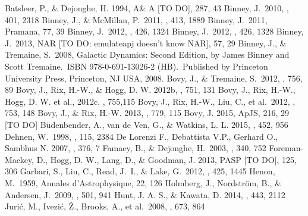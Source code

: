 \documentclass[iop,revtex4]{emulateapj}
\begin{document}
%
\begin{thebibliography}{}
 Batsleer, P., \& Dejonghe, H. 1994, A\& A [TO DO], 287, 43
 Binney, J.\ 2010, \mnras, 401, 2318
 Binney, J., \& McMillan, P.\ 2011, \mnras, 413, 1889
 Binney, J.\ 2011, Pramana, 77, 39
 Binney, J.\ 2012, \mnras, 426, 1324
 Binney, J.\ 2012, \mnras, 426, 1328
 Binney, J.\ 2013, NAR [TO DO: emulateapj doesn't know NAR], 57, 29 
 Binney, J., \& Tremaine, S.\ 2008, Galactic Dynamics: Second Edition, by James Binney and Scott Tremaine.~ISBN 978-0-691-13026-2 (HB).~Published by Princeton University Press, Princeton, NJ USA, 2008.
 Bovy, J., \& Tremaine, S.\ 2012, \apj, 756, 89
 Bovy, J., Rix, H.-W., \& Hogg, D. W. 2012b, \apj, 751, 131
 Bovy, J., Rix, H.-W., Hogg, D. W. et al., 2012c, \apj, 755,115
 Bovy, J., Rix, H.-W., Liu, C., et al.\ 2012, \apj, 753, 148
  Bovy, J., \& Rix, H.-W. 2013, \apj, 779, 115
 Bovy, J. 2015, ApJS, 216, 29 [TO DO]
 B\"{u}denbender, A., van de Ven, G., \& Watkins, L. L. 2015, \mnras, 452, 956
 Dehnen, W.\ 1998, \aj, 115, 
2384 
 De Lorenzi F., Debattista V.P., Gerhard O., Sambhus N. 2007, \mnras, 376, 7
 Famaey, B., \& Dejonghe, H.\ 2003, \mnras, 340, 752 
 Foreman-Mackey, D., Hogg, D. W., Lang, D., \& Goodman, J. 2013, PASP [TO DO], 125, 306
 Garbari, S., Liu, C., Read, J.~I., \& Lake, G.\ 2012, \mnras, 425, 1445 
 Henon, M.\ 1959, Annales d'Astrophysique, 22, 126 
 Holmberg, J., Nordstr{\"o}m, B., \& Andersen, J.\ 2009, \aap, 501, 941 
 Hunt, J. A. S., \& Kawata, D. 2014, \mnras, 443, 2112
 Juri{\'c}, M., Ivezi{\'c}, {\v Z}., Brooks, A., et al.\ 2008, \apj, 673, 864 

\end{thebibliography}
\end{document}
